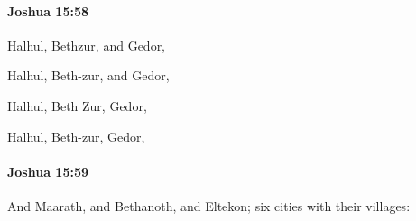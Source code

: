 		\paragraph{Joshua 15:58} %
			\label{JOSHUA-15-58}

			Halhul, Bethzur, and Gedor,

			\begin{versebox}
					\item[BHS] 
					\item[ASV] Halhul, Beth-zur, and Gedor,
					\item[NIV] Halhul, Beth Zur, Gedor,
					\item[NRSV] Halhul, Beth-zur, Gedor,
			\end{versebox}

		\paragraph{Joshua 15:59} %
			\label{JOSHUA-15-59}

			And Maarath, and Bethanoth, and Eltekon; six cities with their villages:


